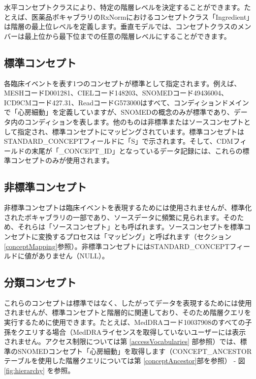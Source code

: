 \documentclass[
  11pt]{book}
\theoremstyle{definition}
\theoremstyle{definition}
\theoremstyle{definition}
\theoremstyle{definition}
\theoremstyle{remark}
\begin{document}
水平コンセプトクラスにより、特定の階層レベルを決定することができます。たとえば、医薬品ボキャブラリのRxNormにおけるコンセプトクラス「Ingredient」は階層の最上位レベルを定義します。垂直モデルでは、コンセプトクラスのメンバーは最上位から最下位までの任意の階層レベルにすることができます。

\subsection{標準コンセプト}\label{standardConcepts}

各臨床イベントを表す1つのコンセプトが標準として指定されます。例えば、MESHコードD001281、CIELコード148203、SNOMEDコード49436004、ICD9CMコード427.31、ReadコードG573000はすべて、コンディションドメインで「心房細動」を定義していますが、SNOMEDの概念のみが標準であり、データ内のコンディションを表します。他のものは非標準またはソースコンセプトとして指定され、標準コンセプトにマッピングされています。標準コンセプトはSTANDARD\_CONCEPTフィールドに「S」で示されます。そして、CDMフィールドの末尾が「\_CONCEPT\_ID」となっているデータ記録には、これらの標準コンセプトのみが使用されます。 

\subsection{非標準コンセプト}\label{ux975eux6a19ux6e96ux30b3ux30f3ux30bbux30d7ux30c8}

非標準コンセプトは臨床イベントを表現するためには使用されませんが、標準化されたボキャブラリの一部であり、ソースデータに頻繁に見られます。そのため、それらは「ソースコンセプト」とも呼ばれます。ソースコンセプトを標準コンセプトに変換するプロセスは「マッピング」と呼ばれます（セクション \ref{conceptMapping}参照）。非標準コンセプトにはSTANDARD\_CONCEPTフィールドに値がありません（NULL）。

\subsection{分類コンセプト}\label{ux5206ux985eux30b3ux30f3ux30bbux30d7ux30c8}

これらのコンセプトは標準ではなく、したがってデータを表現するためには使用されませんが、標準コンセプトと階層的に関連しており、そのため階層クエリを実行するために使用できます。たとえば、MedDRAコード10037908のすべての子孫をクエリする場合（MedDRAライセンスを取得していないユーザーには表示されません。アクセス制限については第 \ref{accessVocabularies} 部参照）では、標準のSNOMEDコンセプト「心房細動」を取得します（CONCEPT\_ANCESTORテーブルを使用した階層クエリについては第 \ref{conceptAncestor}部を参照） - 図 \ref{fig:hierarchy} を参照。 
\end{document}
